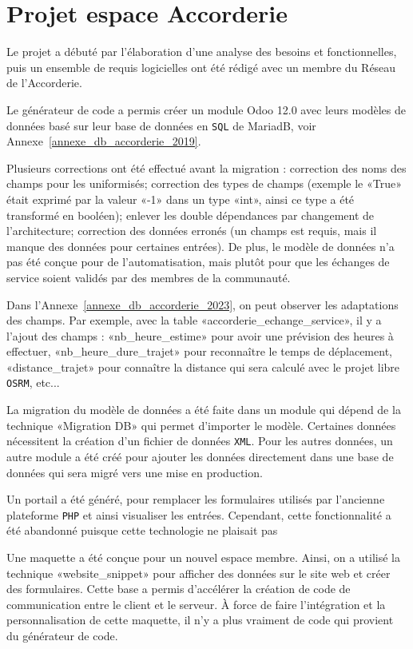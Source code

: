 \section{Projet espace Accorderie}

Le projet a débuté par l'élaboration d'une analyse des besoins et fonctionnelles, puis un ensemble de requis logicielles ont été rédigé avec un membre du Réseau de l'Accorderie. %

Le générateur de code a permis créer un module Odoo 12.0 avec leurs modèles de données basé sur leur base de données en \texttt{SQL} de MariadB, voir Annexe~\ref{annexe_db_accorderie_2019}.

Plusieurs corrections ont été effectué avant la migration : correction des noms des champs pour les uniformisés; correction des types de champs (exemple le «True» était exprimé par la valeur «-1» dans un type «int», ainsi ce type a été transformé en booléen); enlever les double dépendances par changement de l’architecture; correction des données erronés (un champs est requis, mais il manque des données pour certaines entrées). De plus, le modèle de données n’a pas été conçue pour de l’automatisation, mais plutôt pour que les échanges de service soient validés par des membres de la communauté.

Dans l'Annexe~\ref{annexe_db_accorderie_2023}, on peut observer les adaptations des champs. Par exemple, avec la table «accorderie\_echange\_service», il y a l'ajout des champs : «nb\_heure\_estime» pour avoir une prévision des heures à effectuer, «nb\_heure\_dure\_trajet» pour reconnaître le temps de déplacement, «distance\_trajet» pour connaître la distance qui sera calculé avec le projet libre \texttt{OSRM}, etc...

La migration du modèle de données a été faite dans un module qui dépend de la technique «Migration DB» qui permet d'importer le modèle. Certaines données nécessitent la création d’un fichier de données \texttt{XML}. Pour les autres données, un autre module a été créé pour ajouter les données directement dans une base de données qui sera migré vers une mise en production.

Un portail a été généré, pour remplacer les formulaires utilisés par l'ancienne plateforme \texttt{PHP} et ainsi visualiser les entrées. Cependant, cette fonctionnalité a été abandonné puisque cette technologie ne plaisait pas

Une maquette a été conçue pour un nouvel espace membre. Ainsi, on a utilisé la technique «website\_snippet» pour afficher des données sur le site web et créer des formulaires. Cette base a permis d’accélérer la création de code de communication entre le client et le serveur. À force de faire l’intégration et la personnalisation de cette maquette, il n’y a plus vraiment de code qui provient du générateur de code.

